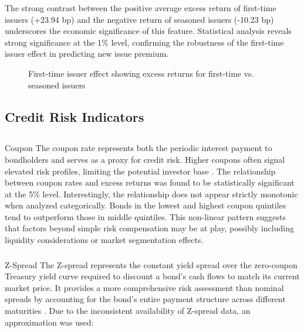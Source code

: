 The strong contrast between the positive average excess return of first-time issuers (+23.94 bp) and the negative return of seasoned issuers (-10.23 bp) underscores the economic significance of this feature. Statistical analysis reveals strong significance at the 1\% level, confirming the robustness of the first-time issuer effect in predicting new issue premium.

\begin{figure}[h]
    \begin{center}
        
    \end{center}
    \caption{First-time issuer effect showing excess returns for first-time vs. seasoned issuers}
    \label{fig:data_availability}
\end{figure}

\subsection{Credit Risk Indicators}

\subsection{}{Coupon}
The coupon rate represents both the periodic interest payment to bondholders and serves as a proxy for credit risk. Higher coupons often signal elevated risk profiles, limiting the potential investor base \parencite{Geerts2022PredictingYield}. The relationship between coupon rates and excess returns was found to be statistically significant at the 5\% level. Interestingly, the relationship does not appear strictly monotonic when analyzed categorically. Bonds in the lowest and highest coupon quintiles tend to outperform those in middle quintiles. This non-linear pattern suggests that factors beyond simple risk compensation may be at play, possibly including liquidity considerations or market segmentation effects.

\subsubsection{}{Z-Spread}
The Z-spread represents the constant yield spread over the zero-coupon Treasury yield curve required to discount a bond's cash flows to match its current market price. It provides a more comprehensive risk assessment than nominal spreads by accounting for the bond's entire payment structure across different maturities \parencite[pp. 816 - 818]{Fabozzi2021TheEdition}. Due to the inconsistent availability of Z-spread data, an approximation was used:

